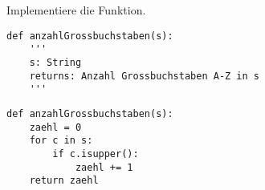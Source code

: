 \question[3] Implementiere die Funktion.
\begin{lstlisting}
def anzahlGrossbuchstaben(s):
    '''
    s: String
    returns: Anzahl Grossbuchstaben A-Z in s
    '''
\end{lstlisting}
\begin{solutionbox}{8cm}
\begin{lstlisting}
def anzahlGrossbuchstaben(s):
    zaehl = 0
    for c in s:
        if c.isupper():
            zaehl += 1
    return zaehl
\end{lstlisting}
\end{solutionbox}
